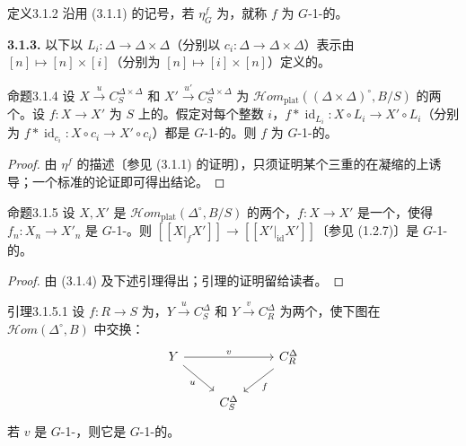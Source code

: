 \begin{SGAresult}{定义}{3.1.2}
沿用 (3.1.1) 的记号，若 $\eta_G^f$ 为，就称 $f$ 为 $G$-1-的。
\end{SGAresult}
\textbf{3.1.3.} 以下以 $L_i:\Delta\to\Delta\times\Delta$（分别以 $c_i:\Delta\to\Delta\times\Delta$）表示由 $[n]\mapsto[n]\times[i]$（分别为 $[n]\mapsto[i]\times[n]$）定义的。
\begin{SGAresult}{命题}{3.1.4}
设 $X\xrightarrow{u}C_S^{\Delta\times\Delta}$ 和 $X'\xrightarrow{u'}C_S^{\Delta\times\Delta}$ 为 $\mathcal{H}om_{\mathrm{plat}}((\Delta\times\Delta)^\circ,B/S)$ 的两个。设 $f:X\to X'$ 为 $S$ 上的。假定对每个整数 $i$，$f*\operatorname{id}_{L_i}:X\circ L_i\to X'\circ L_i$（分别为 $f*\operatorname{id}_{c_i}:X\circ c_i\to X'\circ c_i$）都是 $G$-1-的。则 $f$ 为 $G$-1-的。
\end{SGAresult}
\begin{proof}
由 $\eta^f$ 的描述〔参见 (3.1.1) 的证明〕，只须证明某个三重的在凝缩的上诱导；一个标准的论证即可得出结论。
\end{proof}
\begin{SGAresult}{命题}{3.1.5}
设 $X,X'$ 是 $\mathcal{H}om_{\mathrm{plat}}(\Delta^\circ,B/S)$ 的两个，$f:X\to X'$ 是一个，使得 $f_n:X_n\to X'_n$ 是 $G$-1-。则 $[[X|_fX']]\to[[X'|_{\mathrm{id}}X']]$〔参见 (1.2.7)〕是 $G$-1-的。
\end{SGAresult}
\begin{proof}
由 (3.1.4) 及下述引理得出；引理的证明留给读者。
\end{proof}
\begin{SGAresult}{引理}{3.1.5.1}
设 $f:R\to S$ 为，$Y\xrightarrow{u}C_S^\Delta$ 和 $Y\xrightarrow{v}C_R^\Delta$ 为两个，使下图在 $\mathcal{H}om(\Delta^\circ,B)$ 中交换：
\[
\begin{tikzcd}
Y\arrow[rr,"v"]\arrow[dr,"u"']&&C_R^\Delta\arrow[dl,"f"]\\
&C_S^\Delta&
\end{tikzcd}
\]
若 $v$ 是 $G$-1-，则它是 $G$-1-的。
\end{SGAresult}
